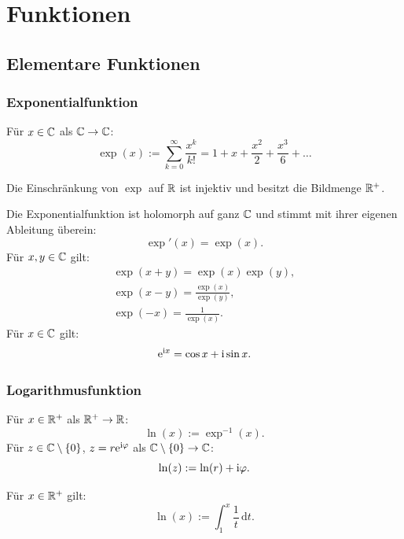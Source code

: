 
\chapter{Funktionen}
\section{Elementare Funktionen}
\subsection{Exponentialfunktion}
\begin{definition}[Exponentialfunktion]\mbox{}\newline
Für $x\in\mathbb C$ als $\mathbb C\to\mathbb C$:
\begin{equation}
\exp(x) := \sum_{k=0}^{\infty} \frac{x^k}{k!}
= 1+x+\frac{x^2}{2}+\frac{x^3}{6}+\ldots
\end{equation}
\end{definition}

\noindent
{}
Die Einschränkung von $\exp$ auf $\mathbb R$ ist injektiv und
besitzt die Bildmenge $\mathbb R^+$.

Die Exponentialfunktion ist holomorph auf ganz $\mathbb C$ und stimmt
mit ihrer eigenen Ableitung überein:
\begin{equation}
\exp'(x) = \exp(x).
\end{equation}
Für $x,y\in\mathbb C$ gilt:
\begin{gather}
\exp(x+y) = \exp(x)\exp(y),\\
\exp(x-y) = \frac{\exp(x)}{\exp(y)},\\
\exp(-x) = \frac{1}{\exp(x)}.
\end{gather}
 Für $x\in\mathbb C$ gilt:
\begin{equation}
\mathrm e^{\mathrm i x} = \cos x+\mathrm i\sin x.
\end{equation}

\subsection{Logarithmusfunktion}
\begin{definition}\mbox{}\newline
Für $x\in\mathbb R^+$ als $\mathbb R^+\to\mathbb R$:
\begin{equation}
\ln(x) := \exp^{-1}(x).
\end{equation}
Für $z\in\mathbb C\setminus\{0\}$, $z=r\mathrm e^{\mathrm i\varphi}$ als
$\mathbb C\setminus\{0\}\to\mathbb C$:
\begin{equation}
\ln(z):=\ln(r)+\mathrm i\varphi.
\end{equation}
\end{definition}
\noindent
{}
Für $x\in\mathbb R^+$ gilt:
\begin{equation}
\ln(x):=\int_1^x \frac{1}{t}\,\mathrm dt.
\end{equation}


